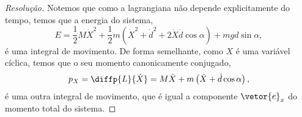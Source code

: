 \begin{proof}[Resolução]
    Notemos que como a lagrangiana não depende explicitamente do tempo, temos que a energia do sistema,
    \begin{equation*}
        E = \frac12M\dot{X}^2 + \frac12m\left(\dot{X}^2 + \dot{d}^2 + 2\dot{X}\dot{d}\cos\alpha\right) + mgd\sin\alpha,
    \end{equation*}
    é uma integral de movimento. De forma semelhante, como \(X\) é uma variável cíclica, temos que o seu momento canonicamente conjugado,
    \begin{equation*}
        p_X = \diffp{L}{\dot{X}} = M \dot{X} + m\left(\dot{X} + \dot{d}\cos\alpha\right),
    \end{equation*}
    é uma outra integral de movimento, que é igual a componente \(\vetor{e}_x\) do momento total do sistema.
\end{proof}
